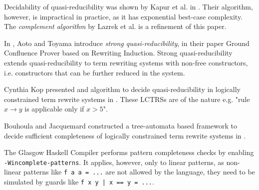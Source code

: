Decidability of quasi-reducibility was shown by Kapur et al. in \cite{kapur}. Their algorithm, however, is impractical in practice, as it has exponential best-case complexity. The \textit{complement algorithm} by Lazrek et al. is a refinement of this paper.

In \cite{aoto}, Aoto and Toyama introduce \textit{strong quasi-reducibility}, in their paper Ground Confluence Prover based on Rewriting Induction. Strong quasi-reducibility extends quasi-reducibility to term rewriting systems with non-free constructors, i.e. constructors that can be further reduced in the system.

Cynthia Kop presented and algorithm to decide quasi-reducibility in logically constrained term rewrite systems in \cite{cynthia}. These LCTRSs are of the nature e.g. "rule $x \rightarrow y$ is applicable only if $x > 5$".

Bouhoula and Jacquemard constructed a tree-automata based framework to decide sufficient completeness of logically constrained term rewrite systems in \cite{bouhoula}.

The Glasgow Haskell Compiler \cite{ghc} performs pattern completeness checks by enabling \texttt{-Wincomplete-patterns}. It applies, however, only to linear patterns, as non-linear patterns like \texttt{f a a = ...} are not allowed by the language, they need to be simulated by guards like \texttt{f x y | x == y = ...}.

